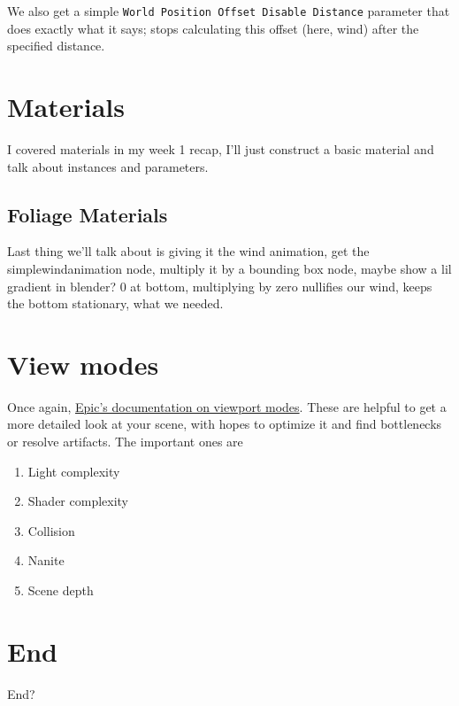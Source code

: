 \documentclass{article}
\begin{document}
	We also get a simple \verb|World Position Offset Disable Distance| parameter that does exactly what it says; stops calculating this offset (here, wind) after the specified distance.
	
	\section{Materials}
	I covered materials in my week 1 recap, I'll just construct a basic material and talk about instances and parameters.
	
	\subsection{Foliage Materials}
	Last thing we'll talk about is giving it the wind animation, get the simplewindanimation node, multiply it by a bounding box node, maybe show a lil gradient in blender? 0 at bottom, multiplying by zero nullifies our wind, keeps the bottom stationary, what we needed.
	
	\section{View modes}
	Once again, \href{https://dev.epicgames.com/documentation/en-us/unreal-engine/viewport-modes-in-unreal-engine}{Epic's documentation on viewport modes}.
	These are helpful to get a more detailed look at your scene, with hopes to optimize it and find bottlenecks or resolve artifacts.
	The important ones are 
	\begin{enumerate}
		\item Light complexity
		\item Shader complexity
		\item Collision
		\item Nanite
		\item Scene depth
	\end{enumerate}
	
	\section{End}
	End?
	
\end{document}
